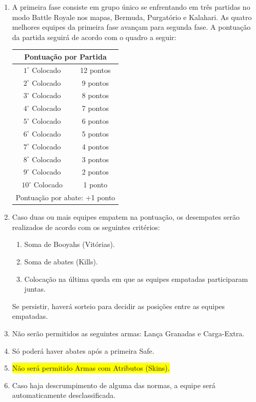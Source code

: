 \begin{enumerate}[start=1,label={\bfseries Art. \arabic*$^\circ$ - }, resume]

    \item A primeira fase consiste em grupo único se enfrentando em três partidas no modo
    Battle Royale nos mapas, Bermuda, Purgatório e Kalahari.
    As quatro melhores equipes da primeira fase avançam para
    segunda fase. A pontuação da partida seguirá de acordo com o quadro
    a seguir:

    \begin{center}
        \begin{tabular}{c c}
            \hline
            \multicolumn{2}{c}{Pontuação por Partida}\\
            \hline
            $1^\circ$  Colocado & 12 pontos \\
            $2^\circ$  Colocado & 9 pontos \\
            $3^\circ$  Colocado & 8 pontos \\
            $4^\circ$  Colocado & 7 pontos \\
            $5^\circ$  Colocado & 6 pontos \\
            $6^\circ$  Colocado & 5 pontos \\
            $7^\circ$  Colocado & 4 pontos \\
            $8^\circ$  Colocado & 3 pontos \\
            $9^\circ$  Colocado & 2 pontos \\
            $10^\circ$ Colocado & 1 ponto \\
            \hline
            \multicolumn{2}{c}{Pontuação por abate: +1 ponto}\\
        \end{tabular}
    \end{center}

    \item Caso duas ou mais equipes empatem na pontuação, os desempates
    serão realizados de acordo com os seguintes critérios:

    \begin{enumerate}[label={\bfseries \Roman* - }]
        \item Soma de Booyahs (Vitórias).
        \item Soma de abates (Kills).
        \item Colocação na última queda em que as equipes empatadas
            participaram juntas.
    \end{enumerate}

    Se persistir, haverá sorteio para decidir as posições entre as equipes
    empatadas.

    \item Não serão permitidos as seguintes armas: Lança Granadas e Carga-Extra.
    \item Só poderá haver abates após a primeira Safe.
    \item \colorbox{yellow}{Não será permitido Armas com Atributos (Skins).}
    \item  Caso haja descrumpimento de alguma das normas, a equipe será automaticamente desclassificada.
\end{enumerate}

